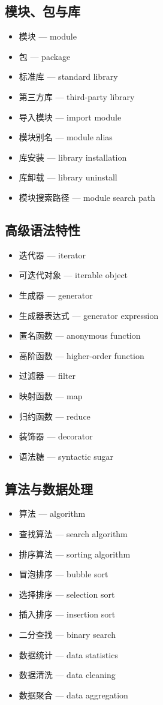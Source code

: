 \subsection{模块、包与库}
\begin{itemize}
\item 模块 — module
\item 包 — package
\item 标准库 — standard library
\item 第三方库 — third-party library
\item 导入模块 — import module
\item 模块别名 — module alias
\item 库安装 — library installation
\item 库卸载 — library uninstall
\item 模块搜索路径 — module search path
\end{itemize}

\subsection{高级语法特性}
\begin{itemize}
\item 迭代器 — iterator
\item 可迭代对象 — iterable object
\item 生成器 — generator
\item 生成器表达式 — generator expression
\item 匿名函数 — anonymous function
\item 高阶函数 — higher-order function
\item 过滤器 — filter
\item 映射函数 — map
\item 归约函数 — reduce
\item 装饰器 — decorator
\item 语法糖 — syntactic sugar
\end{itemize}

\subsection{算法与数据处理}
\begin{itemize}
\item 算法 — algorithm
\item 查找算法 — search algorithm
\item 排序算法 — sorting algorithm
\item 冒泡排序 — bubble sort
\item 选择排序 — selection sort
\item 插入排序 — insertion sort
\item 二分查找 — binary search
\item 数据统计 — data statistics
\item 数据清洗 — data cleaning
\item 数据聚合 — data aggregation
\end{itemize}

